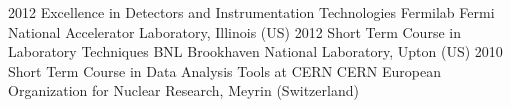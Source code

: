 \documentclass[9pt]{developercv} %
\begin{document}

\vspace{-10 pt}
\begin{entrylist}
    \entry
		{2012}
		{Excellence in Detectors and Instrumentation Technologies}
		{Fermilab}
		{Fermi National Accelerator Laboratory, Illinois (US)}
	\entry
		{2012}
		{Short Term Course in Laboratory Techniques}
		{BNL}
		{Brookhaven National Laboratory, Upton (US)}
	\entry
		{2010}
		{Short Term Course in Data Analysis Tools at CERN}
		{CERN}
		{European Organization for Nuclear Research, Meyrin (Switzerland)}
\end{entrylist}

\end{document}
